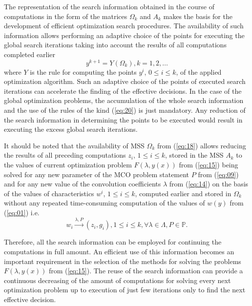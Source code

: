 \documentclass{svproc}
\begin{document}
The representation of the search information obtained in the course of computations in the form of  the matrices $\Omega_k$ and $A_k$ makes the basis for the development of efficient optimization search procedures. The availability of such information allows performing an adaptive choice of the points for executing the global search iterations taking into account the results of all computations completed earlier 
\begin{equation}
\label{eq:20}
y^{k+1}=Y(\Omega_k),k=1,2,\dots
\end{equation}
where $Y$ is the rule for computing the points $y^i$, $0 \leq i \leq k$, of the applied optimization algorithm. Such an adaptive choice of the points of executed search iterations can accelerate the finding of the effective decisions. In the case of the global optimization problems, the accumulation of the whole search information and the use of the rules of the kind (\ref{eq:20}) is just mandatory. Any reduction of the search information in determining the points to be executed would result in executing the excess global search iterations.

It should be noted that the availability of MSS $\Omega_k$ from (\ref{eq:18}) allows reducing the results of all preceding computations $z_i$,  $1 \leq i \leq k$, stored in the MSS $A_k$ to the values of current optimization problem $F(\lambda,y(x))$ from (\ref{eq:15}) being solved for any new parameter of the MCO problem statement $P$ from (\ref{eq:09}) and for any new value of the convolution coefficients $\lambda$ from (\ref{eq:14}) on the basis of the values of characteristics $w^i$, $1 \leq i \leq k$, computed earlier and stored in $\Omega_k$ without any repeated time-consuming computation of the values of $w(y)$ from (\ref{eq:01}) i.e.
\begin{equation}
\label{eq:21}
w_i \xrightarrow{\lambda,P} (z_i,g_i ), 1 \leq i \leq k,\forall \lambda \in \Lambda, P \in \mathbb{P}.
\end{equation}

Therefore, all the search information can be employed for continuing the computations in full amount. An efficient use of this information becomes an important requirement in the selection of the methods for solving the problems $F(\lambda,y(x))$ from (\ref{eq:15}). The reuse of the search information can provide a continuous decreasing of the amount of computations for solving every next optimization problem up to execution of just few iterations only to find the next effective decision.
\end{document}
